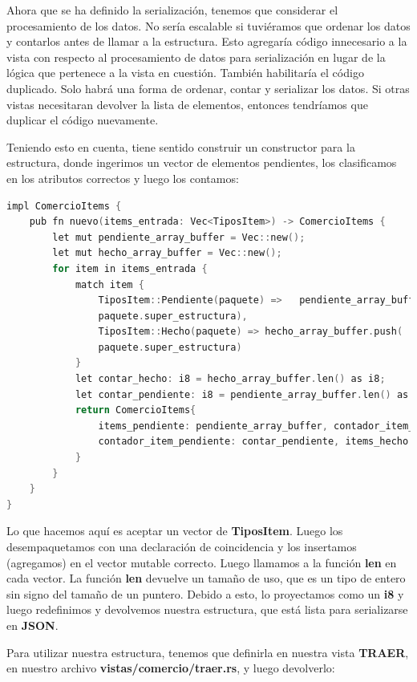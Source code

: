 Ahora que se ha definido la serialización, tenemos que considerar el procesamiento de los datos. No sería escalable si tuviéramos que ordenar los datos y contarlos antes de llamar a la estructura. Esto agregaría código innecesario a la vista con respecto al procesamiento de datos para serialización en lugar de la lógica que pertenece a la vista en cuestión. También habilitaría el código duplicado. Solo habrá una forma de ordenar, contar y serializar los datos. Si otras vistas necesitaran devolver la lista de elementos, entonces tendríamos que duplicar el código nuevamente.

Teniendo esto en cuenta, tiene sentido construir un constructor para la estructura, donde ingerimos un vector de elementos pendientes, los clasificamos en los atributos correctos y luego los contamos:

\begin{lstlisting}[language=C]
impl ComercioItems {
	pub fn nuevo(items_entrada: Vec<TiposItem>) -> ComercioItems {
		let mut pendiente_array_buffer = Vec::new();
		let mut hecho_array_buffer = Vec::new();
		for item in items_entrada {
			match item {
				TiposItem::Pendiente(paquete) =>   pendiente_array_buffer.push(
				paquete.super_estructura),
				TiposItem::Hecho(paquete) => hecho_array_buffer.push(
				paquete.super_estructura)
			}
			let contar_hecho: i8 = hecho_array_buffer.len() as i8;
			let contar_pendiente: i8 = pendiente_array_buffer.len() as i8;
			return ComercioItems{
				items_pendiente: pendiente_array_buffer, contador_item_hecho: contar_hecho,
				contador_item_pendiente: contar_pendiente, items_hecho: hecho_array_buffer
			}
		}
	}
}
\end{lstlisting}

Lo que hacemos aquí es aceptar un vector de \textbf{TiposItem}. Luego los desempaquetamos con una declaración de coincidencia y los insertamos (agregamos) en el vector mutable correcto. Luego llamamos a la función \textbf{len} en cada vector. La función \textbf{len} devuelve un tamaño de uso, que es un tipo de entero sin signo del tamaño de un puntero. Debido a esto, lo proyectamos como un \textbf{i8} y luego redefinimos y devolvemos nuestra estructura, que está lista para serializarse en \textbf{JSON}.

Para utilizar nuestra estructura, tenemos que definirla en nuestra vista \textbf{TRAER}, en nuestro archivo \textbf{vistas/comercio/traer.rs}, y luego devolverlo:


